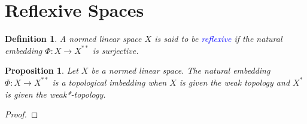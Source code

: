 \documentclass[12pt]{article}
\theoremstyle{thmstyle}
\newtheorem{lemma}[theorem]{Lemma}
\newtheorem{proposition}[theorem]{Proposition}
\theoremstyle{defstyle}
\newtheorem{definition}[theorem]{Definition}
\newcommand{\define}[1]{\textcolor{blue}{\textit{#1}}}
\begin{document}
\section{Reflexive Spaces}

\begin{definition}
    A normed linear space $X$ is said to be \define{reflexive} if the natural embedding $\Phi: X\to X^{\ast\ast}$ is surjective.
\end{definition}

\begin{proposition}
    Let $X$ be a normed linear space. The natural embedding $\Phi: X\to X^{\ast\ast}$ is a topological imbedding when $X$ is given the weak topology and $X^\ast$ is given the weak*-topology.
\end{proposition}
\begin{proof}
\end{proof}
\end{document}
